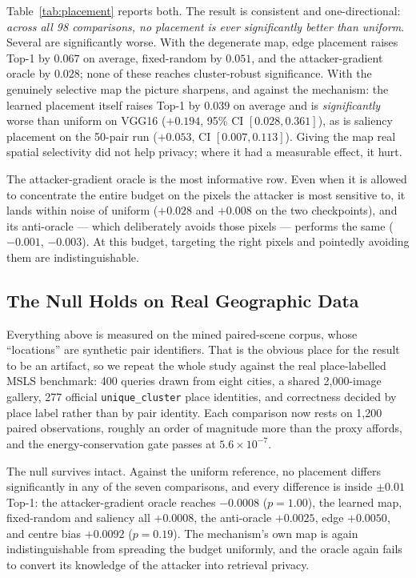\documentclass[10pt,journal]{IEEEtran}
\begin{document}
Table~\ref{tab:placement} reports both. The result is consistent and
one-directional: \emph{across all 98 comparisons, no placement is ever
significantly better than uniform}. Several are significantly worse. With the
degenerate map, edge placement raises Top-1 by $0.067$ on average,
fixed-random by $0.051$, and the attacker-gradient oracle by $0.028$; none of
these reaches cluster-robust significance. With the genuinely selective map
the picture sharpens, and against the mechanism: the learned placement itself
raises Top-1 by $0.039$ on average and is \emph{significantly} worse than
uniform on VGG16 ($+0.194$, 95\% CI $[0.028, 0.361]$), as is saliency
placement on the 50-pair run ($+0.053$, CI $[0.007, 0.113]$). Giving the map
real spatial selectivity did not help privacy; where it had a measurable
effect, it hurt.

The attacker-gradient oracle is the most informative row. Even when it is
allowed to concentrate the entire budget on the pixels the attacker is most
sensitive to, it lands within noise of uniform ($+0.028$ and $+0.008$ on the
two checkpoints), and its anti-oracle --- which deliberately avoids those
pixels --- performs the same ($-0.001$, $-0.003$). At this budget, targeting
the right pixels and pointedly avoiding them are indistinguishable.

\subsection{The Null Holds on Real Geographic Data}
\label{sec:msls_placement}

Everything above is measured on the mined paired-scene corpus, whose
``locations'' are synthetic pair identifiers. That is the obvious place for
the result to be an artifact, so we repeat the whole study against the real
place-labelled MSLS benchmark: 400 queries drawn from eight cities, a shared
2,000-image gallery, 277 official \texttt{unique\_cluster} place identities,
and correctness decided by place label rather than by pair identity. Each
comparison now rests on 1,200 paired observations, roughly an order of
magnitude more than the proxy affords, and the energy-conservation gate passes
at $5.6\times10^{-7}$.

The null survives intact. Against the uniform reference, no placement differs
significantly in any of the seven comparisons, and every difference is inside
$\pm0.01$ Top-1: the attacker-gradient oracle reaches $-0.0008$ ($p=1.00$),
the learned map, fixed-random and saliency all $+0.0008$, the anti-oracle
$+0.0025$, edge $+0.0050$, and centre bias $+0.0092$ ($p=0.19$). The
mechanism's own map is again indistinguishable from spreading the budget
uniformly, and the oracle again fails to convert its knowledge of the
attacker into retrieval privacy.
\end{document}
